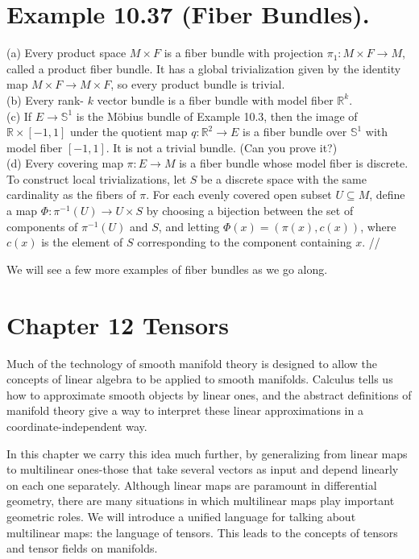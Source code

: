 \documentclass[10pt, letterpaper]{article}
\begin{document}
\section*{Example 10.37 (Fiber Bundles).}
(a) Every product space $M \times F$ is a fiber bundle with projection $\pi_{1}: M \times F \rightarrow M$, called a product fiber bundle. It has a global trivialization given by the identity map $M \times F \rightarrow M \times F$, so every product bundle is trivial.\\
(b) Every rank- $k$ vector bundle is a fiber bundle with model fiber $\mathbb{R}^{k}$.\\
(c) If $E \rightarrow \mathbb{S}^{1}$ is the Möbius bundle of Example 10.3, then the image of $\mathbb{R} \times[-1,1]$ under the quotient map $q: \mathbb{R}^{2} \rightarrow E$ is a fiber bundle over $\mathbb{S}^{1}$ with model fiber $[-1,1]$. It is not a trivial bundle. (Can you prove it?)\\
(d) Every covering map $\pi: E \rightarrow M$ is a fiber bundle whose model fiber is discrete. To construct local trivializations, let $S$ be a discrete space with the same cardinality as the fibers of $\pi$. For each evenly covered open subset $U \subseteq M$, define a map $\Phi: \pi^{-1}(U) \rightarrow U \times S$ by choosing a bijection between the set of components of $\pi^{-1}(U)$ and $S$, and letting $\Phi(x)=(\pi(x), c(x))$, where $c(x)$ is the element of $S$ corresponding to the component containing $x$. //

We will see a few more examples of fiber bundles as we go along.






\pagebreak






\section*{Chapter 12 Tensors}

Much of the technology of smooth manifold theory is designed to allow the concepts of linear algebra to be applied to smooth manifolds. Calculus tells us how to approximate smooth objects by linear ones, and the abstract definitions of manifold theory give a way to interpret these linear approximations in a coordinate-independent way.

In this chapter we carry this idea much further, by generalizing from linear maps to multilinear ones-those that take several vectors as input and depend linearly on each one separately. Although linear maps are paramount in differential geometry, there are many situations in which multilinear maps play important geometric roles. We will introduce a unified language for talking about multilinear maps: the language of tensors. This leads to the concepts of tensors and tensor fields on manifolds.
\end{document}
